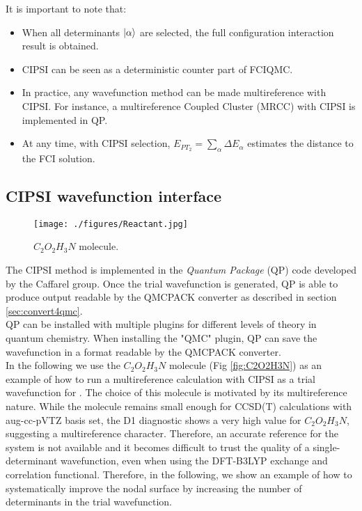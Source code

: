 It is important to note that:
\begin{itemize}
\item When all determinants $\lvert \alpha \rangle$ are selected, the full configuration interaction result is obtained.\\
\item CIPSI can be seen as a deterministic counter part of FCIQMC. \\
\item In practice, any wavefunction method can be made multireference with CIPSI. For instance, a multireference Coupled Cluster (MRCC) with CIPSI is implemented in QP.\cite{Garniron2017-1}\\
\item At any time, with CIPSI selection, $E_{PT_2}=\sum_\alpha \Delta E_\alpha$ estimates the distance to the FCI solution.
\end{itemize}


\subsection{CIPSI wavefunction interface}
\label{sec:cipsi}


\begin{figure}
\begin{center}
\texttt{[image: ./figures/Reactant.jpg]}
\end{center}
\caption{$C_2O_2H_3N$ molecule.}
\protect{\label{fig:C2O2H3N}}
\end{figure}
The CIPSI method
is implemented in the \textit{Quantum Package} (QP) code\cite{QP} developed by the Caffarel group. Once the trial wavefunction is generated, QP is able to produce output readable by the QMCPACK converter as described in section \ref{sec:convert4qmc}.\\
QP can be installed with multiple plugins for different levels of theory in quantum chemistry. When installing the "QMC" plugin, QP can save the wavefunction in a format readable by the QMCPACK converter. \\

In the following we use the $C_2O_2H_3N$ molecule (Fig \ref{fig:C2O2H3N}) as an example of how to run a multireference calculation with CIPSI as a trial wavefunction for \qmcpack. The choice of this molecule is motivated by its multireference nature. While the molecule remains small enough for CCSD(T) calculations with aug-cc-pVTZ basis set, the D1 diagnostic shows a very high value for  $C_2O_2H_3N$, suggesting a multireference character.  Therefore, an accurate reference for the system is not available and it becomes difficult to trust the quality of a single-determinant wavefunction, even when using the DFT-B3LYP exchange and correlation functional. Therefore, in the following, we show an example of how to systematically improve the nodal surface by increasing the number of determinants in the trial wavefunction.\\

